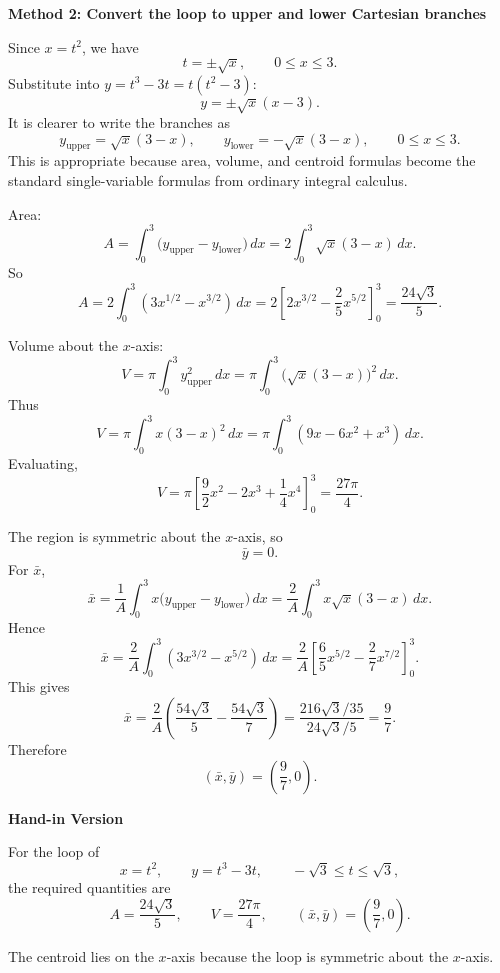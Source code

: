 \documentclass[a4paper,12pt,twocolumn]{article}
\newenvironment{solutionbox}{\begin{framed}}{\end{framed}}
\begin{document}
\begin{solutionbox}
\textbf{Method 2: Convert the loop to upper and lower Cartesian branches}

\begin{steps}
\item Since \(x=t^2\), we have
\[
t=\pm\sqrt{x},
\qquad 0\le x\le 3.
\]
Substitute into \(y=t^3-3t=t(t^2-3)\):
\[
y=\pm\sqrt{x}(x-3).
\]
It is clearer to write the branches as
\[
y_{\text{upper}}=\sqrt{x}(3-x),
\qquad
y_{\text{lower}}=-\sqrt{x}(3-x),
\qquad 0\le x\le 3.
\]
This is appropriate because area, volume, and centroid formulas become the standard single-variable formulas from ordinary integral calculus.

\item Area:
\[
A=\int_0^3\bigl(y_{\text{upper}}-y_{\text{lower}}\bigr)\,dx
=2\int_0^3\sqrt{x}(3-x)\,dx.
\]
So
\[
A=2\int_0^3\left(3x^{1/2}-x^{3/2}\right)\,dx
=2\left[2x^{3/2}-\frac25 x^{5/2}\right]_0^3
=\frac{24\sqrt3}{5}.
\]

\item Volume about the \(x\)-axis:
\[
V=\pi\int_0^3 y_{\text{upper}}^2\,dx
=\pi\int_0^3\bigl(\sqrt{x}(3-x)\bigr)^2\,dx.
\]
Thus
\[
V=\pi\int_0^3 x(3-x)^2\,dx
=\pi\int_0^3(9x-6x^2+x^3)\,dx.
\]
Evaluating,
\[
V=\pi\left[\frac92 x^2-2x^3+\frac14 x^4\right]_0^3
=\frac{27\pi}{4}.
\]

\item The region is symmetric about the \(x\)-axis, so
\[
\bar y=0.
\]
For \(\bar x\),
\[
\bar x=\frac{1}{A}\int_0^3 x\bigl(y_{\text{upper}}-y_{\text{lower}}\bigr)\,dx
=\frac{2}{A}\int_0^3 x\sqrt{x}(3-x)\,dx.
\]
Hence
\[
\bar x=\frac{2}{A}\int_0^3\left(3x^{3/2}-x^{5/2}\right)\,dx
=\frac{2}{A}\left[\frac65 x^{5/2}-\frac27 x^{7/2}\right]_0^3.
\]
This gives
\[
\bar x=\frac{2}{A}\left(\frac{54\sqrt3}{5}-\frac{54\sqrt3}{7}\right)
=\frac{216\sqrt3/35}{24\sqrt3/5}
=\frac97.
\]
Therefore
\[
(\bar x,\bar y)=\left(\frac97,0\right).
\]
\end{steps}
\end{solutionbox}

\begin{solutionbox}
\textbf{Hand-in Version}

For the loop of
\[
x=t^2,\qquad y=t^3-3t,\qquad -\sqrt3\le t\le\sqrt3,
\]
the required quantities are
\[
\boxed{A=\frac{24\sqrt3}{5}},
\qquad
\boxed{V=\frac{27\pi}{4}},
\qquad
\boxed{(\bar x,\bar y)=\left(\frac97,0\right)}.
\]

The centroid lies on the \(x\)-axis because the loop is symmetric about the \(x\)-axis.
\end{solutionbox}
\end{document}
